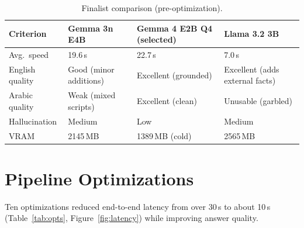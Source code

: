 \begin{table}[htbp]
	\caption{Finalist comparison (pre-optimization).}
	\label{tab:finalists}
\begin{tabularx}{\textwidth}{@{}lXXX@{}}
	\toprule
	\textbf{Criterion} & \textbf{Gemma 3n E4B} & \textbf{Gemma 4 E2B Q4 (selected)} & \textbf{Llama 3.2 3B}\\
	\midrule
Avg.\ speed     & 19.6\,s & 22.7\,s & 7.0\,s\\
English quality & Good (minor additions) & Excellent (grounded) & Excellent (adds external facts)\\
Arabic quality  & Weak (mixed scripts) & Excellent (clean) & Unusable (garbled)\\
Hallucination   & Medium & Low & Medium\\
VRAM            & 2145\,MB & 1389\,MB (cold) & 2565\,MB\\
	\bottomrule
\end{tabularx}
\end{table}

\FloatBarrier
\section{Pipeline Optimizations}
Ten optimizations reduced end-to-end latency from over 30\,s to about 10\,s
(Table~\ref{tab:opts}, Figure~\ref{fig:latency}) while improving answer quality.

